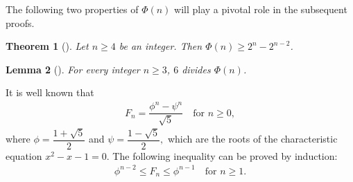 \documentclass[12pt,reqno]{amsart}
\newtheorem{theorem}{Theorem}[section]
\newtheorem{lemma} [theorem]{Lemma}
\begin{document}
The following two properties of $\Phi(n)$ will play a pivotal role in the subsequent proofs.
\begin{theorem}[\cite{Tmm}]\label{thm for bound}
    Let $n\geq 4$ be an integer. Then $\Phi(n)\geq2^{n}-2^{n-2}$.
\end{theorem}
\begin{lemma}[\cite{T1,Tmm}]\label{Lemma 1} For every integer $n\geq3$, $6$ divides $ \Phi(n)$.  
\end{lemma}
It is well known that 
\begin{align*}\label{eq2}
F_{n}=\dfrac{\phi ^{n}-\psi ^{n}}{\sqrt{5}}   \quad \text{for  } n\geq0, \tag{2}
\end{align*}
where $\phi =\dfrac{1+\sqrt{5}}{2}$ and $\psi =\dfrac{1-\sqrt{5}}{2},$ which are the roots of the characteristic equation $x^{2}-x-1=0$. The following inequality can be proved by induction:
\begin{align*}\label{eq3}
    \phi ^{n-2}\leq F_{n}\leq \phi ^{n-1}  \quad \text{for  } n\geq1.\tag{3}
\end{align*}
\end{document}
